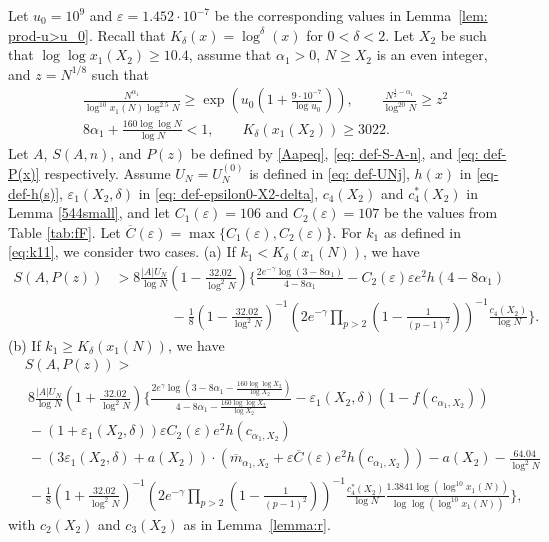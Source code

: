 \documentclass[12pt]{amsart}
\begin{document}
\begin{theorem}
\label{theo:S>1}
Let $u_0=10^9$ and $\varepsilon=1.452\cdot 10^{-7}$ be the corresponding values in Lemma~\ref{lem: prod-u>u_0}. Recall that $K_{\delta}(x) = \log^\delta(x)$ for $0 < \delta < 2$.
Let $X_2$ be such that $\log\log x_1(X_2)\ge 10.4$, assume that $\alpha_1>0$, $N\ge X_2$ is an even integer, and $z = N^{1/8}$ such that
\begin{align}
&\frac{N^{\alpha_1}}{\log^{10} x_1(N) \log^{2.5} N}\ge \exp\left(u_0\left(1+\frac{9\cdot 10^{-7}}{\log u_0} \right)\right), \quad \quad \frac{N^{\frac{1}{2}-\alpha_1}}{\log^{20} N}\ge z^2 \nonumber \\
&8\alpha_1+\frac{160\log \log N}{\log N}<1, \quad \quad K_{\delta}(x_1(X_2)) \ge 3022.\label{cond: S-A-P-z}
\end{align} 
Let $A$, $S(A, n)$, and $P(z)$ be defined by \eqref{Aapeq}, \eqref{eq: def-S-A-n}, and \eqref{eq: def-P(x)} respectively. Assume $U_N = U_N^{(0)}$ is defined in \eqref{eq: def-UNj}, $h(x)$ in \eqref{eq-def-h(s)}, $\varepsilon_1(X_2, \delta)$ in \eqref{eq: def-epsilon0-X2-delta}, $c_4(X_2)$ and $c_4^*(X_2)$ in Lemma \ref{544small}, and let $C_1(\varepsilon)=106$ and $C_2(\varepsilon)=107$ be the values from Table \ref{tab:fF}. Let \label{def-C-upper-bar} $\overline{C}(\varepsilon)=\max\{C_1(\varepsilon),C_2(\varepsilon)\}$.
For $k_1$ as defined in \eqref{eq:k11}, we consider two cases.\newline
(a) If $k_1<K_{\delta}(x_1(N))$, we have
\begin{align*}
    S(A,P(z))&>8\frac{|A| U_N}{\log N}\left(1-\frac{32.02}{\log^2 N}\right)\Bigg\{\frac{2e^{-\gamma}\log(3-8\alpha_1)}{4-8\alpha_1}-C_2(\varepsilon)\varepsilon e^2h(4-8\alpha_1)\nonumber\\
    &\qquad\qquad-\frac{1}{8}\left(1-\frac{32.02}{\log^2 N}\right)^{-1}\left(2e^{-\gamma}\prod_{p>2}\left(1-\frac{1}{(p-1)^2}\right)\right)^{-1}\frac{c_4(X_2)}{\log N}\Bigg\}.
\end{align*}
(b) If $k_1\ge K_{\delta}(x_1(N))$, we have
\begin{align*}
    &S(A,P(z))>\\
    &\ 8\frac{|A| U_N}{\log N}\left(1+\frac{32.02}{\log^2N}\right)\Bigg\{\frac{2e^{\gamma}\log(3-8\alpha_1-\frac{160\log\log X_2}{\log X_2})}{4-8\alpha_1-\frac{160\log\log X_2}{\log X_2}}-\varepsilon_1(X_2,\delta)(1-f(c_{\alpha_1,X_2})) \\
    &\ -(1+\varepsilon_1(X_2,\delta))\varepsilon C_2(\varepsilon)e^2h(c_{\alpha_1,X_2}) \\
    &\ -\left(3\varepsilon_1(X_2,\delta)+ a(X_2) \right)\cdot(\overline{m}_{\alpha_1,X_2}+\varepsilon \overline{C}(\varepsilon)e^2h(c_{\alpha_1,X_2}))-a(X_2)-\frac{64.04}{\log^2N}\\
    &\ -\frac{1}{8}\left(1+\frac{32.02}{\log^2 N}\right)^{-1}\left(2e^{-\gamma}\prod_{p>2}\left(1-\frac{1}{(p-1)^2}\right)\right)^{-1}\frac{c_4^*(X_2)}{\log N}\frac{1.3841\log(\log^{10}x_1(N))}{\log\log(\log^{10}x_1(N))}\Bigg\},
\end{align*}
with $c_2(X_2)$ and $c_3(X_2)$ as in Lemma~\ref{lemma:r}.
\end{theorem}
\end{document}
